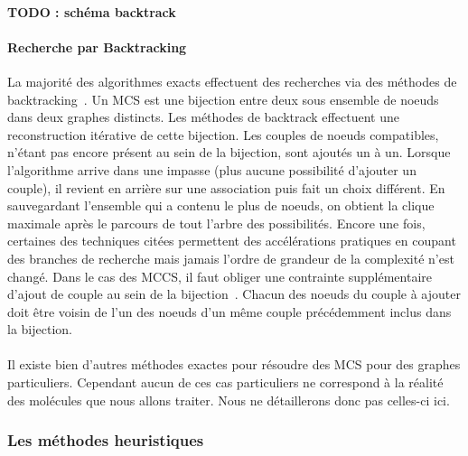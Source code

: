 \documentclass[12pt,french,twoside]{report}
\begin{document}
\paragraph{TODO : schéma backtrack}

\paragraph{Recherche par Backtracking}
La majorité des algorithmes exacts effectuent des recherches via des méthodes de backtracking~\cite{manic_branch&cut_2009,mcgregor_backtrack_1982,kawabata_build-up_2011}.
Un MCS est une bijection entre deux sous ensemble de noeuds dans deux graphes distincts.
Les méthodes de backtrack effectuent une reconstruction itérative de cette bijection.
Les couples de noeuds compatibles, n'étant pas encore présent au sein de la bijection, sont ajoutés un à un.
Lorsque l'algorithme arrive dans une impasse (plus aucune possibilité d'ajouter un couple), il revient en arrière sur une association puis fait un choix différent.
En sauvegardant l'ensemble qui a contenu le plus de noeuds, on obtient la clique maximale après le parcours de tout l'arbre des possibilités.
Encore une fois, certaines des techniques citées permettent des accélérations pratiques en coupant des branches de recherche mais jamais l'ordre de grandeur de la complexité n'est changé.
Dans le cas des MCCS, il faut obliger une contrainte supplémentaire d'ajout de couple au sein de la bijection~\cite{chang_moderately_2014}.
Chacun des noeuds du couple à ajouter doit être voisin de l'un des noeuds d'un même couple précédemment inclus dans la bijection.

\paragraph{}Il existe bien d'autres méthodes exactes pour résoudre des MCS pour des graphes particuliers.
Cependant aucun de ces cas particuliers ne correspond à la réalité des molécules que nous allons traiter.
Nous ne détaillerons donc pas celles-ci ici.


\subsubsection{Les méthodes heuristiques}
\end{document}
